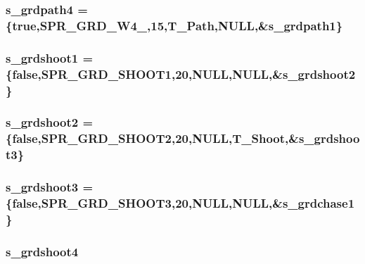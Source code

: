 \label{WL__ACT2_8C_ae062aa8aa55b457c49c9c80da5c3c3cb}
\hypertarget{WL__ACT2_8C_aa9d66e67ff04606e339fc6a2b55d996b}{
\subsubsection[{s\_\-grdpath4}]{ {\bf s\_\-grdpath4} = \{true,SPR\_\-GRD\_\-W4\_,15,T\_\-Path,NULL,\&{\bf s\_\-grdpath1}\}}}
\label{WL__ACT2_8C_aa9d66e67ff04606e339fc6a2b55d996b}
\hypertarget{WL__ACT2_8C_a39b5370f31810ba2344e1444df90c005}{
\subsubsection[{s\_\-grdshoot1}]{ {\bf s\_\-grdshoot1} = \{false,SPR\_\-GRD\_\-SHOOT1,20,NULL,NULL,\&{\bf s\_\-grdshoot2}\}}}
\label{WL__ACT2_8C_a39b5370f31810ba2344e1444df90c005}
\hypertarget{WL__ACT2_8C_aeb91a0672afeb327c1fcf4b2b8eba34f}{
\subsubsection[{s\_\-grdshoot2}]{ {\bf s\_\-grdshoot2} = \{false,SPR\_\-GRD\_\-SHOOT2,20,NULL,T\_\-Shoot,\&{\bf s\_\-grdshoot3}\}}}
\label{WL__ACT2_8C_aeb91a0672afeb327c1fcf4b2b8eba34f}
\hypertarget{WL__ACT2_8C_ac3860c54706008267e1a959fe5c9bec2}{
\subsubsection[{s\_\-grdshoot3}]{ {\bf s\_\-grdshoot3} = \{false,SPR\_\-GRD\_\-SHOOT3,20,NULL,NULL,\&{\bf s\_\-grdchase1}\}}}
\label{WL__ACT2_8C_ac3860c54706008267e1a959fe5c9bec2}
\hypertarget{WL__ACT2_8C_ad4618db66286b9a721f5928dd2f9d3f2}{
\subsubsection[{s\_\-grdshoot4}]{ {\bf s\_\-grdshoot4}}}
